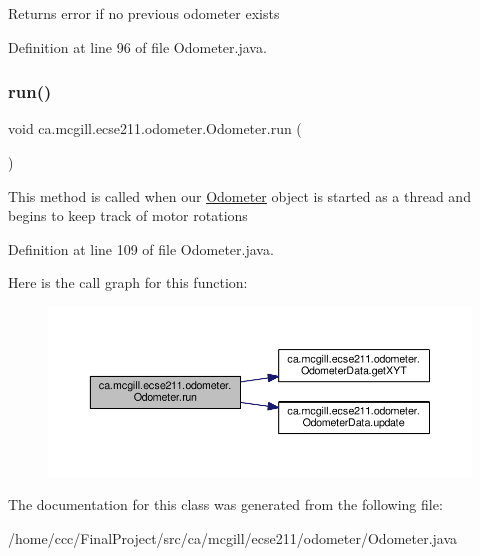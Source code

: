 \begin{DoxyReturn}{Returns}
error if no previous odometer exists 
\end{DoxyReturn}


Definition at line 96 of file Odometer.\+java.

\mbox{\label{classca_1_1mcgill_1_1ecse211_1_1odometer_1_1_odometer_af0ff4c5121973a8310cf986e25fa0d87}} 
\subsubsection{\texorpdfstring{run()}{run()}}
{\footnotesize\ttfamily void ca.\+mcgill.\+ecse211.\+odometer.\+Odometer.\+run (\begin{DoxyParamCaption}{ }\end{DoxyParamCaption})}

This method is called when our \hyperlink{classca_1_1mcgill_1_1ecse211_1_1odometer_1_1_odometer}{Odometer} object is started as a thread and begins to keep track of motor rotations 

Definition at line 109 of file Odometer.\+java.

Here is the call graph for this function\+:
\nopagebreak
\begin{figure}[H]
\begin{center}
\leavevmode
\includegraphics[width=350pt]{classca_1_1mcgill_1_1ecse211_1_1odometer_1_1_odometer_af0ff4c5121973a8310cf986e25fa0d87_cgraph}
\end{center}
\end{figure}


The documentation for this class was generated from the following file\+:\begin{DoxyCompactItemize}
\item 
/home/ccc/\+Final\+Project/src/ca/mcgill/ecse211/odometer/Odometer.\+java\end{DoxyCompactItemize}

